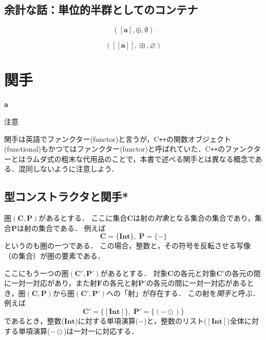 \documentclass[twocolumn]{jsbook}
\def\[{[\![}
\def\]{]\!]}
\newcommand{\cxx}{\textrm{C}\texttt{++}}
\newcommand{\keyword}[1]{{\emph{#1}}}
\newenvironment{leader}{\begingroup\bf}{\endgroup}
\newcommand{\hsklType}[1]{\textbf{#1}}
\DeclareMathOperator{\hsklMap}{\odot}
\DeclareMathOperator{\hsklMaybeAppend}{\boxplus}
\newcommand{\hsklAppend}{\oplus}
\newcommand{\hsklEmptyList}{\emptyset}
\newcommand{\hsklInt}{\hsklType{Int}}
\newcommand{\hsklNothing}{\varnothing}
\newcommand{\hsklListType}[1]{[#1]}
\newcommand{\hsklMaybeType}[1]{\[#1\]}
\newcommand{\mathSet}[1]{\mathbf{#1}}
\newcommand{\mathCategoryShort}[2]{(#1,#2)}
\newcommand{\mathMonoid}[3]{(#1,#2,#3)}
\begin{document}
\section{余計な話：単位的半群としてのコンテナ}

$$\mathMonoid{\hsklListType{\hsklType{a}}}{\hsklAppend}{\hsklEmptyList}$$

$$\mathMonoid{\hsklMaybeType{\hsklType{a}}}{\hsklMaybeAppend}{\hsklNothing}$$


\chapter{関手}
\label{ch:functor}

\begin{leader}
a
\end{leader}

\begin{boxnote}
\begin{center}
注意
\end{center}
関手は英語でファンクター(functor)と言うが，\cxx の関数オブジェクト(functional)もかつてはファンクター(functor)と呼ばれていた．\cxx のファンクターとはラムダ式の粗末な代用品のことで，本書で述べる関手とは異なる概念である．混同しないように注意しよう．
\end{boxnote}


\section{型コンストラクタと関手*}

圏$\mathCategoryShort{\mathSet{C}}{\mathSet{P}}$があるとする．
ここに集合$\mathSet{C}$は射の\keyword{対象}となる集合の集合であり，集合$\mathSet{P}$は射の集合である．
例えば$$\mathSet{C}=\{\hsklInt\},\;\mathSet{P}=\{-\}$$というのも圏の一つである．
この場合，整数と，その符号を反転させる写像（の集合）が圏の要素である．

ここにもう一つの圏$\mathCategoryShort{\mathSet{C}'}{\mathSet{P}'}$があるとする．
対象$\mathSet{C}$の各元と対象$\mathSet{C}'$の各元の間に一対一対応があり，また射$\mathSet{F}$の各元と射$\mathSet{P}'$の各元の間に一対一対応があるとき，圏$\mathCategoryShort{\mathSet{C}}{\mathSet{P}}$から圏$\mathCategoryShort{\mathSet{C}'}{\mathSet{P}'}$への「射」が存在する．
この射を\keyword{関手}と呼ぶ．
例えば$$\mathSet{C}'=\{\hsklListType{\hsklInt}\},\;\mathSet{P}'=\{(-\hsklMap)\}$$であるとき，整数($\hsklInt$)に対する単項演算($-$)と，整数のリスト($\hsklListType{\hsklInt}$)全体に対する単項演算($-\hsklMap$)は一対一に対応する．
\end{document}
